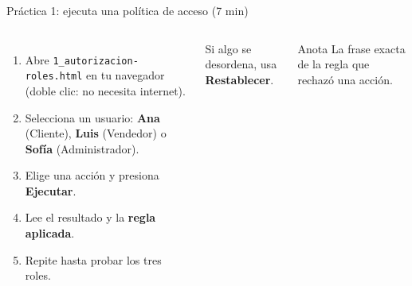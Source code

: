 \documentclass[aspectratio=169,10pt,c]{beamer}
\begin{document}
\begin{frame}{Práctica 1: ejecuta una política de acceso \textnormal{\small(7 min)}}
\begin{columns}[T,onlytextwidth]
\begin{enumerate}\setlength\itemsep{5pt}\small
  \item Abre \texttt{1\_autorizacion-roles.html} en tu navegador (doble clic: no necesita internet).
  \item Selecciona un usuario: \textbf{Ana} (Cliente), \textbf{Luis} (Vendedor) o \textbf{Sofía} (Administrador).
  \item Elige una acción y presiona \textbf{Ejecutar}.
  \item Lee el resultado y la \textbf{regla aplicada}.
  \item Repite hasta probar los tres roles.
\end{enumerate}
\vspace{0.1cm}
\small Si algo se desordena, usa \textbf{Restablecer}.
\vspace{0.15cm}
\begin{exampleblock}{Anota}
\small La frase exacta de la regla que rechazó una acción.
\end{exampleblock}
\end{columns}
\end{frame}
\end{document}
